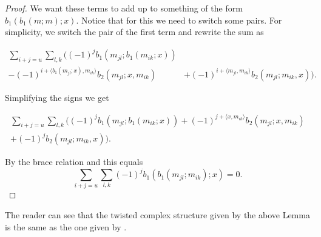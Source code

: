 \documentclass[Thesis.tex]{subfiles}
\begin{document}
\begin{proof}
We want these terms to add up to something of the form $b_1(b_1(m;m);x)$. Notice that for this we need to switch some pairs. For simplicity, we switch the pair of the first term and rewrite the sum as

\begin{align*}
\sum_{i+j=u}\sum_{l,k}((-1)^jb_1(m_{jl}; b_1(m_{ik};x))&\\
 -(-1)^{i+\langle b_1(m_{jl};x),m_{ik}\rangle}b_2(m_{jl};x,m_{ik})&+(-1)^{i+\langle m_{jl}, m_{ik}\rangle}b_2(m_{jl};m_{ik},x)).
\end{align*}

Simplifying the signs we get

\begin{gather*}
\sum_{i+j=u}\sum_{l,k}((-1)^jb_1(m_{jl}; b_1(m_{ik};x))+(-1)^{j+\langle x,m_{ik}\rangle}b_2(m_{jl};x,m_{ik})\\+(-1)^{j}b_2(m_{jl};m_{ik},x)).
\end{gather*}

By the brace relation and  this equals
\[\sum_{i+j=u}\sum_{l,k}(-1)^jb_1(b_1(m_{jl};m_{ik});x)=0.\]
\end{proof}

The reader can see that the twisted complex structure given by the above Lemma is the same as the one given by .

\end{document}
